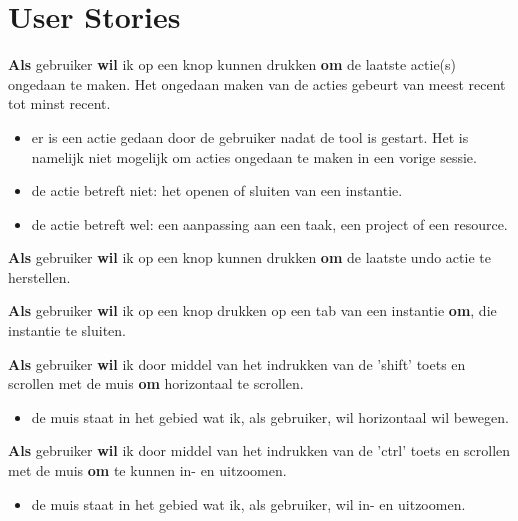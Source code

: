 \section{User Stories}
\setcounter{userstory}{0}
\nextUserStory
\textbf{Als} gebruiker \textbf{wil} ik op een knop kunnen drukken \textbf{om} de laatste actie(s) ongedaan te maken. Het ongedaan maken van de acties gebeurt van meest recent tot minst recent. 
\begin{itemize} [label=\emph{ - Gegeven}, itemindent=2.5em, labelsep=0.3em]
    \item er is een actie gedaan door de gebruiker nadat de tool is gestart. Het is namelijk niet mogelijk om acties ongedaan te maken in een vorige sessie. 
    \item de actie betreft niet: het openen of sluiten van een instantie.
    \item de actie betreft wel: een aanpassing aan een taak, een project of een resource. 
\end{itemize}

\nextUserStory
\textbf{Als} gebruiker \textbf{wil} ik op een knop kunnen drukken \textbf{om} de laatste undo actie te herstellen. 

\nextUserStory
\textbf{Als} gebruiker \textbf{wil} ik op een knop drukken op een tab van een instantie \textbf{om}, die instantie te sluiten. 

\nextUserStory
\textbf{Als} gebruiker \textbf{wil} ik door middel van het indrukken van de 'shift' toets en scrollen met de muis \textbf{om} horizontaal te scrollen. 
\begin{itemize} [label=\emph{ - Gegeven}, itemindent=2.5em, labelsep=0.3em]
    \item de muis staat in het gebied wat ik, als gebruiker, wil horizontaal wil bewegen. 
\end{itemize}

\nextUserStory
\textbf{Als} gebruiker \textbf{wil} ik door middel van het indrukken van de 'ctrl' toets en scrollen met de muis \textbf{om} te kunnen in- en uitzoomen. 
\begin{itemize} [label=\emph{ - Gegeven}, itemindent=2.5em, labelsep=0.3em]
    \item de muis staat in het gebied wat ik, als gebruiker, wil in- en uitzoomen. 
\end{itemize}

